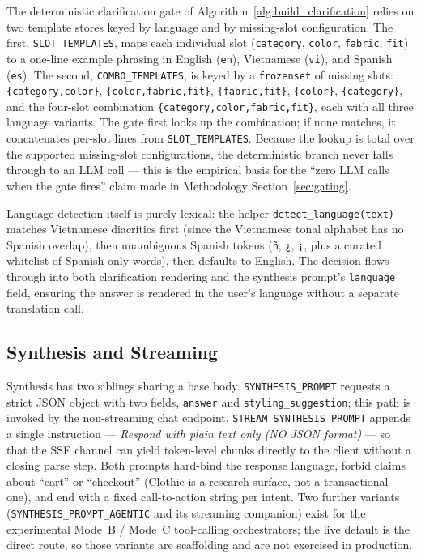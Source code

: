The deterministic clarification gate of Algorithm~\ref{alg:build_clarification} relies on two template stores keyed by language and by missing-slot configuration. The first, \texttt{SLOT\_TEMPLATES}, maps each individual slot (\texttt{category}, \texttt{color}, \texttt{fabric}, \texttt{fit}) to a one-line example phrasing in English (\texttt{en}), Vietnamese (\texttt{vi}), and Spanish (\texttt{es}). The second, \texttt{COMBO\_TEMPLATES}, is keyed by a \texttt{frozenset} of missing slots: \texttt{\{category,color\}}, \texttt{\{color,fabric,fit\}}, \texttt{\{fabric,fit\}}, \texttt{\{color\}}, \texttt{\{category\}}, and the four-slot combination \texttt{\{category,color,fabric,fit\}}, each with all three language variants. The gate first looks up the combination; if none matches, it concatenates per-slot lines from \texttt{SLOT\_TEMPLATES}. Because the lookup is total over the supported missing-slot configurations, the deterministic branch never falls through to an LLM call --- this is the empirical basis for the ``zero LLM calls when the gate fires'' claim made in Methodology Section~\ref{sec:gating}.

Language detection itself is purely lexical: the helper \texttt{detect\_language(text)} matches Vietnamese diacritics first (since the Vietnamese tonal alphabet has no Spanish overlap), then unambiguous Spanish tokens (\texttt{ñ}, \texttt{¿}, \texttt{¡}, plus a curated whitelist of Spanish-only words), then defaults to English. The decision flows through into both clarification rendering and the synthesis prompt's \texttt{language} field, ensuring the answer is rendered in the user's language without a separate translation call.

\subsection{Synthesis and Streaming}

Synthesis has two siblings sharing a base body. \texttt{SYNTHESIS\_PROMPT} requests a strict JSON object with two fields, \texttt{answer} and \texttt{styling\_suggestion}; this path is invoked by the non-streaming chat endpoint. \texttt{STREAM\_SYNTHESIS\_PROMPT} appends a single instruction --- \emph{Respond with plain text only (NO JSON format)} --- so that the SSE channel can yield token-level chunks directly to the client without a closing parse step. Both prompts hard-bind the response language, forbid claims about ``cart'' or ``checkout'' (Clothie is a research surface, not a transactional one), and end with a fixed call-to-action string per intent. Two further variants (\texttt{SYNTHESIS\_PROMPT\_AGENTIC} and its streaming companion) exist for the experimental Mode~B / Mode~C tool-calling orchestrators; the live default is the direct route, so those variants are scaffolding and are not exercised in production.

